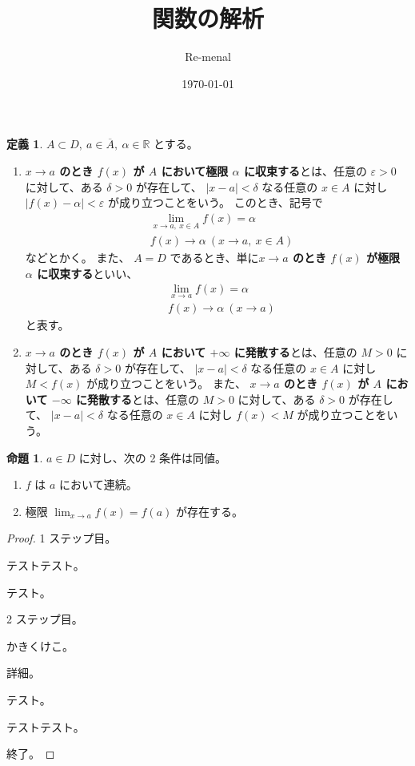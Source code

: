 \documentclass[uplatex,dvipdfmx,a4paper]{jsarticle}
\title{関数の解析}
\author{Re-menal}
\date{\today}
\theoremstyle{definition}
\newtheorem{proposition}[theorem]{命題}
\newtheorem{definition}[theorem]{定義}
\newcommand{\R}{\mathbb{R}}
\newcommand{\dps}{\displaystyle}
\newcommand{\ve}{\varepsilon}
\newcommand{\cl}[1]{\overline{#1}}
\begin{document}
\begin{definition}
\label{def-limit-of-function}
$A \subset D,\ a \in \cl{A},\ \alpha \in \R$ とする。
\begin{enumerate}
    \item \textbf{$x \to a$ のとき $f(x)$ が $A$ において極限 $\alpha$ に収束する}とは、任意の $\ve > 0$ に対して、ある $\delta > 0$ が存在して、 $|x - a| < \delta$ なる任意の $x \in A$ に対し $|f(x) - \alpha| < \ve$ が成り立つことをいう。
    このとき、記号で 
    \begin{align*}
        & \lim_{x \to a,\ x \in A} f(x) = \alpha \\ 
        & f(x) \to \alpha\ (x \to a,\ x \in A)
    \end{align*}
    などとかく。
    また、 $A = D$ であるとき、単に\textbf{$x \to a$ のとき $f(x)$ が極限 $\alpha$ に収束する}といい、
    \begin{align*}
        & \lim_{x \to a} f(x) = \alpha \\ 
        & f(x) \to \alpha\ (x \to a)
    \end{align*}
    と表す。
    \item \textbf{$x \to a$ のとき $f(x)$ が $A$ において $+\infty$ に発散する}とは、任意の $M > 0$ に対して、ある $\delta > 0$ が存在して、 $|x - a| < \delta$ なる任意の $x \in A$ に対し $M < f(x)$ が成り立つことをいう。
    また、 \textbf{$x \to a$ のとき $f(x)$ が $A$ において $-\infty$ に発散する}とは、任意の $M > 0$ に対して、ある $\delta > 0$ が存在して、 $|x - a| < \delta$ なる任意の $x \in A$ に対し $f(x) < M$ が成り立つことをいう。
\end{enumerate}
\end{definition}
\begin{proposition}
\label{prop-charactarization-of-continuity-of-function}
$a \in D$ に対し、次の 2 条件は同値。
\begin{enumerate}
    \item $f$ は $a$ において連続。
    \item 極限 $\dps \lim_{x \to a} f(x) = f(a)$ が存在する。
\end{enumerate}
\end{proposition}
\begin{proof}
    1 ステップ目。
    \par
    テストテスト。
    \par
    テスト。
    \par
    2 ステップ目。
    \par
    かきくけこ。
    \begin{oframed}%
        詳細。
        \par
        テスト。
        \par
        テストテスト。
    \end{oframed}%
    \par
    終了。
\end{proof}
\end{document}

